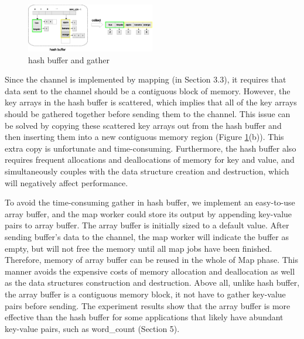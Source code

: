 \begin{figure}[!h!t]  
	\centering
	\includegraphics[width=0.5\textwidth]{eps/dmr_hash_buffer.eps}
	\caption{hash buffer and gather}
	\label{fig:dmr:hash-buffer}
\end{figure}



Since the channel is implemented by mapping (in Section 3.3), it requires that data sent to the channel should be a contiguous block of memory.
However, the key arrays in the hash buffer is scattered, which implies that all of the key arrays should be gathered together before sending them to the channel.
This issue can be solved by copying these scattered key arrays out from the hash buffer and then inserting them into a new contiguous memory region (Figure \ref{fig:dmr:hash-buffer}(b)).
This extra copy is unfortunate and time-consuming.
Furthermore, the hash buffer also requires frequent allocations and deallocations of memory for key and value, and simultaneously couples with the data structure creation and destruction, which will negatively affect performance.


To avoid the time-consuming gather in hash buffer, we  implement an easy-to-use array buffer, and the map worker could store its output by appending  key-value pairs to array buffer.
The array buffer is initially sized to a default value.
After sending buffer's data to the channel, the map worker will indicate the buffer as empty, but will not free the memory until all map jobs have been finished.
Therefore, memory of array buffer can be reused in the whole of Map phase.
This manner avoids the expensive costs of memory allocation and deallocation as well as the data structures construction and destruction.
Above all, unlike hash buffer, the array buffer is a contiguous memory block, it not have to gather key-value pairs before sending.
The experiment results show that the array buffer is more effective than the hash buffer for some applications that likely have abundant key-value pairs, such as word\_count (Section 5).

